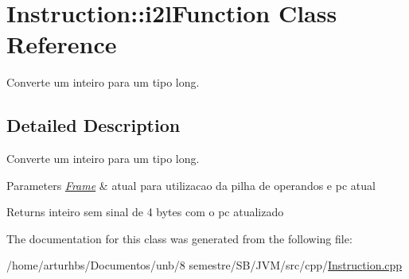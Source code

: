 \hypertarget{classInstruction_1_1i2lFunction}{}\section{Instruction\+:\+:i2l\+Function Class Reference}
\label{classInstruction_1_1i2lFunction}


Converte um inteiro para um tipo long.  




\subsection{Detailed Description}
Converte um inteiro para um tipo long. 


\begin{DoxyParams}{Parameters}
{\em \hyperlink{classFrame}{Frame}} & atual para utilizacao da pilha de operandos e pc atual \\
\hline
\end{DoxyParams}
\begin{DoxyReturn}{Returns}
inteiro sem sinal de 4 bytes com o pc atualizado 
\end{DoxyReturn}


The documentation for this class was generated from the following file\+:\begin{DoxyCompactItemize}
\item 
/home/arturhbs/\+Documentos/unb/8 semestre/\+S\+B/\+J\+V\+M/src/cpp/\hyperlink{Instruction_8cpp}{Instruction.\+cpp}\end{DoxyCompactItemize}
